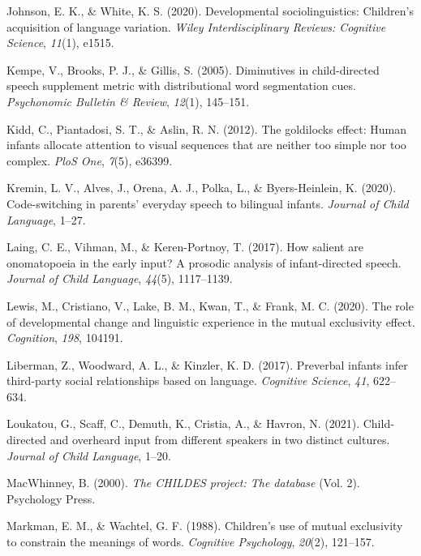 \documentclass[10pt, letterpaper]{article}
\newenvironment{CSLReferences}%
  {}%
  {\par}
\begin{document}
\begin{CSLReferences}{1}{0}
\leavevmode\hypertarget{ref-johnson2020developmental}{}%
Johnson, E. K., \& White, K. S. (2020). Developmental sociolinguistics:
Children's acquisition of language variation. \emph{Wiley
Interdisciplinary Reviews: Cognitive Science}, \emph{11}(1), e1515.

\leavevmode\hypertarget{ref-kempe2005diminutives}{}%
Kempe, V., Brooks, P. J., \& Gillis, S. (2005). Diminutives in
child-directed speech supplement metric with distributional word
segmentation cues. \emph{Psychonomic Bulletin \& Review}, \emph{12}(1),
145--151.

\leavevmode\hypertarget{ref-kidd2012goldilocks}{}%
Kidd, C., Piantadosi, S. T., \& Aslin, R. N. (2012). The goldilocks
effect: Human infants allocate attention to visual sequences that are
neither too simple nor too complex. \emph{PloS One}, \emph{7}(5),
e36399.

\leavevmode\hypertarget{ref-kremin2020code}{}%
Kremin, L. V., Alves, J., Orena, A. J., Polka, L., \& Byers-Heinlein, K.
(2020). Code-switching in parents' everyday speech to bilingual infants.
\emph{Journal of Child Language}, 1--27.

\leavevmode\hypertarget{ref-laing2017salient}{}%
Laing, C. E., Vihman, M., \& Keren-Portnoy, T. (2017). How salient are
onomatopoeia in the early input? A prosodic analysis of infant-directed
speech. \emph{Journal of Child Language}, \emph{44}(5), 1117--1139.

\leavevmode\hypertarget{ref-lewis2020role}{}%
Lewis, M., Cristiano, V., Lake, B. M., Kwan, T., \& Frank, M. C. (2020).
The role of developmental change and linguistic experience in the mutual
exclusivity effect. \emph{Cognition}, \emph{198}, 104191.

\leavevmode\hypertarget{ref-liberman2017preverbal}{}%
Liberman, Z., Woodward, A. L., \& Kinzler, K. D. (2017). Preverbal
infants infer third-party social relationships based on language.
\emph{Cognitive Science}, \emph{41}, 622--634.

\leavevmode\hypertarget{ref-loukatou2021child}{}%
Loukatou, G., Scaff, C., Demuth, K., Cristia, A., \& Havron, N. (2021).
Child-directed and overheard input from different speakers in two
distinct cultures. \emph{Journal of Child Language}, 1--20.

\leavevmode\hypertarget{ref-macwhinney2000childes}{}%
MacWhinney, B. (2000). \emph{The CHILDES project: The database} (Vol.
2). Psychology Press.

\leavevmode\hypertarget{ref-markman1988children}{}%
Markman, E. M., \& Wachtel, G. F. (1988). Children's use of mutual
exclusivity to constrain the meanings of words. \emph{Cognitive
Psychology}, \emph{20}(2), 121--157.


\end{CSLReferences}
\end{document}
